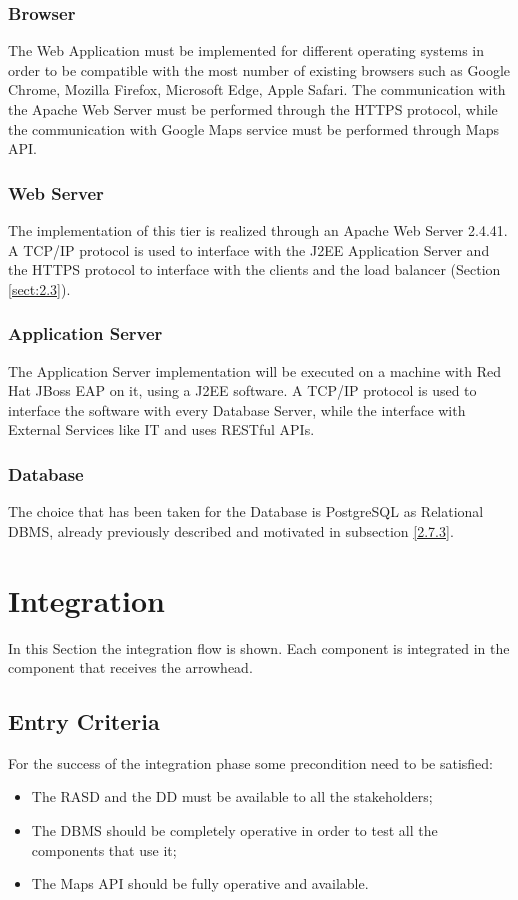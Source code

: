 \documentclass[../DD.tex]{subfiles}
\begin{document}
\subsubsection{Browser}
The Web Application must be implemented for different operating systems in order to be compatible with the most number of existing browsers such as Google Chrome, Mozilla Firefox, Microsoft Edge, Apple Safari. The communication with the Apache Web Server must be performed through the HTTPS protocol, while the communication with Google Maps service must be performed through Maps API.

\subsubsection{Web Server}
The implementation of this tier is realized through an Apache Web Server 2.4.41. A TCP/IP protocol is used to interface with the J2EE Application Server and the HTTPS protocol to interface with the clients and the load balancer (Section \ref{sect:2.3}). 

\subsubsection{Application Server}
The Application Server implementation will be executed on a machine with Red Hat JBoss EAP on it, using a J2EE software. A TCP/IP protocol is used to interface the software with every Database Server, while the interface with External Services like  IT and  uses RESTful APIs.

\subsubsection{Database}
The choice that has been taken for the Database is PostgreSQL as Relational DBMS, already previously described and motivated in subsection \ref{2.7.3}.


\newpage


\section{Integration\label{5.3}}

In this Section the integration flow is shown. Each component is integrated in the component that receives the arrowhead.
\subsection{Entry Criteria}
For the success of the integration phase some precondition need to be satisfied:
\begin{itemize}
	\item{The RASD and the DD must be available to all the stakeholders;}
	\item{The DBMS should be completely operative in order to test all the components that use it;} 
	\item{The Maps API should be fully operative and available.}
\end{itemize}
\end{document}
